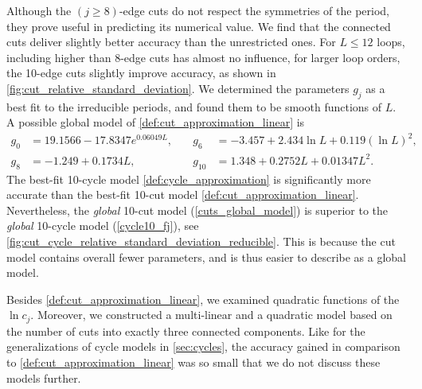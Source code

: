 \documentclass[11pt]{scrartcl}
\numberwithin{equation}{section}
\begin{document}
Although the $(j\geq 8)$-edge cuts do not respect the symmetries of the period, they prove useful in predicting its numerical value. We find that the connected cuts deliver slightly better accuracy than the unrestricted ones. For $L \leq 12$ loops,  including higher than $8$-edge cuts has almost no influence, for larger loop orders, the 10-edge cuts slightly improve accuracy, as shown in \cref{fig:cut_relative_standard_deviation}.  
We determined the parameters $g_j$ as a best fit to the irreducible periods, and found them to be smooth functions of $L$. A possible global model of \cref{def:cut_approximation_linear} is
\begin{align}\label{cuts_global_model}
	g_0 &= 19.1566 -17.8347 e^{ 0.06049 L}, \quad &g_6 &= -3.457 + 2.434 \ln L + 0.119 (\ln L)^2, \nonumber\\
	g_8 &= -1.249 + 0.1734 L , \qquad &g_{10} &= 1.348 + 0.2752 L + 0.01347 L^2.
\end{align}
The best-fit 10-cycle model \cref{def:cycle_approximation} is significantly more accurate than the best-fit 10-cut model \cref{def:cut_approximation_linear}. Nevertheless, the \emph{global} 10-cut model (\cref{cuts_global_model}) is superior to the \emph{global} 10-cycle model (\cref{cycle10_fj}), see \cref{fig:cut_cycle_relative_standard_deviation_reducible}. This is because the cut model contains overall fewer parameters, and is thus easier to describe as a global model. 


Besides \cref{def:cut_approximation_linear}, we  examined quadratic functions of the $\ln  c_j $. Moreover, we constructed a multi-linear and a quadratic model based on the number of cuts into exactly three connected components. Like for the generalizations of cycle models in \cref{sec:cycles}, the accuracy gained in comparison to \cref{def:cut_approximation_linear} was so small that we do not discuss these models further. 
\end{document}

